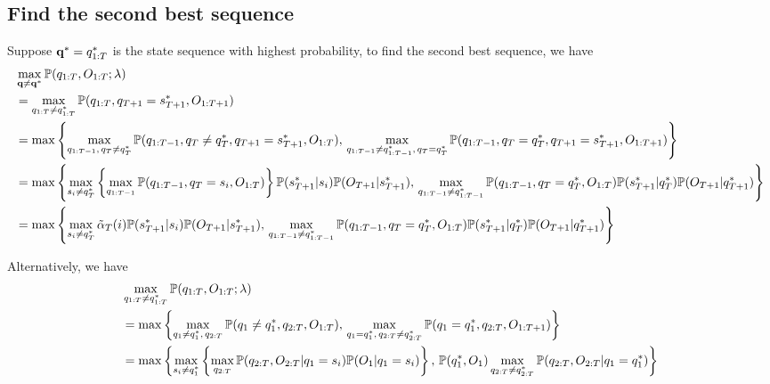 \subsection{Find the second best sequence}
\label{ssec:2ndbest}

Suppose $\mathbf{q}^* = q_{1:T}^*$ is the state sequence with highest probability,
to find the second best sequence, we have
\begin{align*}
&\max_{\mathbf{q} \ne \mathbf{q}^*} \mathbb{P}(q_{1:T}, O_{1:T}; \lambda) \\
&= \max_{q_{1:T} \ne q_{1:T}^*} \mathbb{P}(q_{1:T}, q_{T+1} = s_{T+1}^*, O_{1:T+1}) \\
&= \max \left\{
    \max_{q_{1:T-1}, \, q_T \ne q_T^*} \mathbb{P}(q_{1:T-1}, q_T \ne q_T^*, q_{T+1} = s_{T+1}^*, O_{1:T}), \,
    \max_{q_{1:T-1} \ne q_{1:T-1}^*, \, q_T = q_T^*} \mathbb{P}(q_{1:T-1}, q_T = q_T^*, q_{T+1} = s_{T+1}^*, O_{1:T+1}) 
   \right\} \\
&= \max \left\{
   \max_{s_i \ne q_T^*} \left\{ \max_{q_{1:T-1}} \mathbb{P}(q_{1:T-1}, q_T = s_i, O_{1:T}) \right\} 
        \mathbb{P}(s_{T+1}^* |s_i) \mathbb{P}(O_{T+1} | s_{T+1}^*), \,
   \max_{q_{1:T-1} \ne q_{1:T-1}^*} \mathbb{P}(q_{1:T-1}, q_T = q_T^*, O_{1:T}) \mathbb{P}(s_{T+1}^* |q_{T}^*) \mathbb{P}(O_{T+1} |q_{T+1}^*)
   \right\} \\
&= \max \left\{
   \max_{s_i \ne q_T^*} \tilde{\alpha}_{T}(i)
        \mathbb{P}(s_{T+1}^* |s_i) \mathbb{P}(O_{T+1} | s_{T+1}^*), \,
   \max_{q_{1:T-1} \ne q_{1:T-1}^*} \mathbb{P}(q_{1:T-1}, q_T = q_T^*, O_{1:T}) \mathbb{P}(s_{T+1}^* |q_{T}^*) \mathbb{P}(O_{T+1} |q_{T+1}^*)
   \right\} 
\end{align*}

Alternatively, we have
\begin{align*}
&\max_{q_{1:T} \ne q_{1:T}^*} \mathbb{P}(q_{1:T}, O_{1:T}; \lambda) \\
&= \max \left\{
    \max_{q_1 \ne q_1^*, \, q_{2:T}} \mathbb{P}(q_1 \ne q_1^*, q_{2:T}, O_{1:T}), \,
    \max_{q_1 = q_1^*, \, q_{2:T} \ne q_{2:T}^*} \mathbb{P}(q_1 = q_1^*, q_{2:T}, O_{1:T+1}) 
   \right\} \\
&= \max \left\{
    \max_{s_i \ne q_1^*} \left\{ \max_{q_{2:T}} \mathbb{P}(q_{2:T}, O_{2:T} |q_1 = s_i) \mathbb{P}(O_1 |q_1 = s_i) \right\}, \,
    \mathbb{P}(q_1^*, O_1) \max_{q_{2:T} \ne q_{2:T}^*} \mathbb{P}(q_{2:T}, O_{2:T} |q_1 = q_1^*) 
   \right\}
\end{align*}

